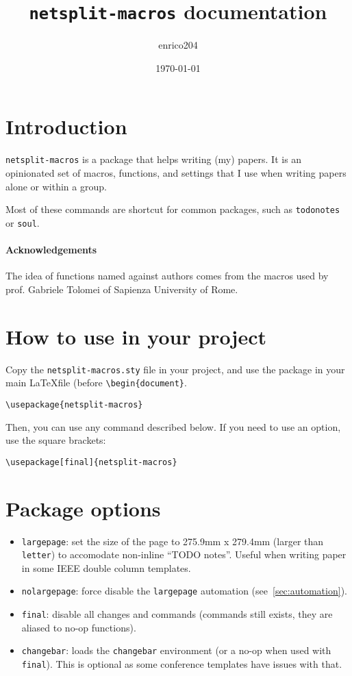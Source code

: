 \documentclass[a4paper]{article}
\title{\texttt{netsplit-macros} documentation}
\author{enrico204}
\date{\today}
\begin{document}
\maketitle

\tableofcontents

\section{Introduction}
\texttt{netsplit-macros} is a package that helps writing (my) papers. It is an opinionated set of macros, functions, and settings that I use when writing papers alone or within a group.

Most of these commands are shortcut for common packages, such as \texttt{todonotes} or \texttt{soul}.

\paragraph{Acknowledgements} The idea of functions named against authors comes from the macros used by prof. Gabriele Tolomei of Sapienza University of Rome.

\section{How to use in your project}

Copy the \texttt{netsplit-macros.sty} file in your project, and use the package in your main \LaTeX file (before \texttt{\textbackslash begin\{document\}}.

\begin{verbatim}
\usepackage{netsplit-macros}
\end{verbatim}

Then, you can use any command described below. If you need to use an option, use the square brackets:

\begin{verbatim}
\usepackage[final]{netsplit-macros}
\end{verbatim}


\section{Package options}
\label{sec:options}

\begin{itemize}
    \item \texttt{largepage}: set the size of the page to 275.9mm x 279.4mm (larger than \texttt{letter}) to accomodate non-inline ``TODO notes''. Useful when writing paper in some IEEE double column templates.
    \item \texttt{nolargepage}: force disable the \texttt{largepage} automation (see~\autoref{sec:automation}).
    \item \texttt{final}: disable all changes and commands (commands still exists, they are aliased to no-op functions).
    \item \texttt{changebar}: loads the \texttt{changebar} environment (or a no-op when used with \texttt{final}). This is optional as some conference templates have issues with that.
\end{itemize}
\end{document}
